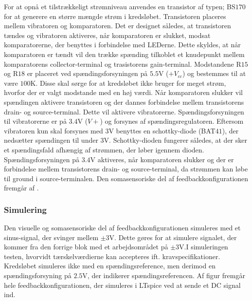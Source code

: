 For at opnå et tilstrækkeligt strømniveau anvendes en transistor af typen; BS$170$ for at generere en større mængde strøm i kredsløbet. Transistoren placeres mellem vibratoren og komparatoren. Det er designet således, at transistoren tændes og vibratoren aktiveres, når komparatoren er slukket, modsat komparatorerne, der benyttes i forbindelse med LEDerne. Dette skyldes, at når komparatoren er tændt vil den trække spænding tilkoblet et knudepunkt mellem komparatorens collector-terminal og trasistorens gain-terminal. Modstandene R$15$ og R$18$ er placeret ved spændingsforsyningen på $5.5$V ($+V_{cc}$) og bestemmes til at være $100$K. Disse skal sørge for at kredsløbet ikke bruger for meget strøm, hvorfor der er valgt modstande med en høj værdi. Når komparatoren slukker vil spændingen aktivere transistoren og der dannes forbindelse mellem transistorens drain- og source-terminal. Dette vil aktivere vibratorerne. Spændingsforsyningen til vibratorerne er på $3.4$V ($V+$) og forsynes af spændingsregulatoren. Eftersom vibratoren kun skal forsynes med $3$V benyttes en schottky-diode (BAT$41$), der nedsætter spændingen til under $3$V. Schottky-dioden fungerer således, at der sker et spændingsfald afhængig af strømmen, der løber igennem dioden. Spændingsforsyningen på $3.4$V aktiveres, når komparatoren slukker og der er forbindelse mellem transistorens drain- og source-terminal, da strømmen kan løbe til ground i source-terminalen. Den somasensoriske del af feedbackkonfigurationen fremgår af .
 
\subsubsection{Simulering}
Den visuelle og somasensoriske del af feedbackkonfigurationen simuleres med et sinus-signal, der svinger mellem $\pm3$V. Dette gøres for at simulere signalet, der kommer fra den forrige blok med et arbejdsområdet på $\pm3$V.I simuleringen testen, hvorvidt tærskelværdierne kan accepteres ift. kravspecifikationer. Kredsløbet simuleres ikke med en spændingsreference, men derimod en spændingsforsyning på $2.5$V, der indikerer spændingsreferencen. Af figur  fremgår hele feedbackkonfigurationen, der simuleres i LTspice ved at sende et DC signal ind.   

